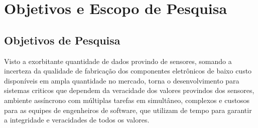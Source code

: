 



\section{Objetivos e Escopo de Pesquisa}
\subsection{Objetivos de Pesquisa}
Visto a exorbitante quantidade de dados provindo de sensores, somando a incerteza da qualidade de fabricação dos componentes eletrônicos de baixo custo disponíveis em ampla quantidade no mercado, torna o desenvolvimento para sistemas criticos que dependem da veracidade dos valores provindos dos sensores, ambiente assíncrono com múltiplas tarefas em simultâneo, complexos e custosos para as equipes de engenheiros de software, que utilizam de tempo para garantir a integridade e veracidades de todos os valores. 

